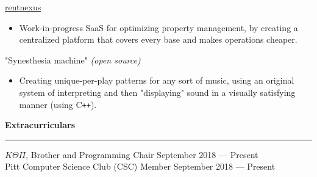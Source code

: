 \documentclass[11pt]{article}
\begin{document}
\begin{flushleft}
		\vspace{2.25mm}
		\href{https://rentnexus.net}{rentnexus}
		\vspace{-1.25mm}
		\begin{itemize}
			\item Work-in-progress SaaS for optimizing property management, by creating a centralized platform that covers every base and makes operations cheaper.
		\end{itemize}
		\vspace{-1.25mm}
		"Synesthesia machine" \textit{(open source)}
		\vspace{-1.25mm}
		\begin{itemize}
			\item Creating unique-per-play patterns for any sort of music, using an original system of interpreting and then "displaying" sound in a visually satisfying manner (using C\texttt{++}).
		\end{itemize}

		\vspace{1.35mm}
		{\large \raggedright \textbf{Extracurriculars}}
		\vspace{1.25mm}
	
		\hrule
	
		\vspace{2.25mm}
		$K\Theta\Pi$, Brother and Programming Chair \hfill September 2018 --- Present\\
		Pitt Computer Science Club (CSC) Member \hfill September 2018 --- Present
	\end{flushleft}
\end{document}
